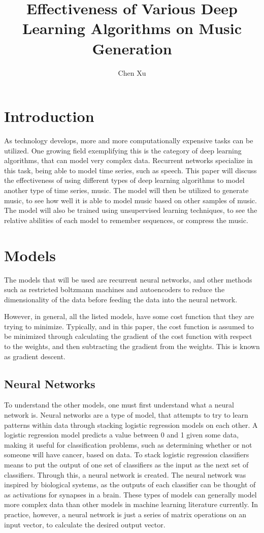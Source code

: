 \documentclass{article}
\begin{document}
\author{Chen Xu}
\title{Effectiveness of Various Deep Learning Algorithms on Music Generation}
\maketitle

\section{Introduction}
As technology develops, more and more computationally expensive tasks can be
utilized. One growing field exemplifying this is the category of deep learning
algorithms, that can model very complex data.  Recurrent networks specialize in
this task, being able to model time series, such as speech. This paper will
discuss the effectiveness of using different types of deep learning algorithms
to model another type of time series, music. The model will then be utilized to
generate music, to see how well it is able to model music based on other samples
of music. The model will also be trained using unsupervised learning techniques,
to see the relative abilities of each model to remember sequences, or compress
the music.

\section{Models}
The models that will be used are recurrent neural networks, and other methods
such as restricted boltzmann machines and autoencoders to reduce the
dimensionality of the data before feeding the data into the neural network.

However, in general, all the listed models, have some cost function that they
are trying to minimize. Typically, and in this paper, the cost function is
assumed to be minimized through calculating the gradient of the cost function
with respect to the weights, and then subtracting the gradient from the weights.
This is known as gradient descent.

\subsection{Neural Networks}
To understand the other models, one must first understand what a neural network
is. Neural networks are a type of model, that attempts to try to learn patterns
within data through stacking logistic regression models on each other. A
logistic regression model predicts a value between 0 and 1 given some data,
making it useful for classification problems, such as determining whether or not
someone will have cancer, based on data. To stack logistic regression
classifiers means to put the output of one set of classifiers as the input as
the next set of classifiers. Through this, a neural network is created. The
neural network was inspired by biological systems, as the outputs of each
classifier can be thought of as activations for synapses in a brain. These types
of models can generally model more complex data than other models in machine
learning literature currently. In practice, however, a neural network is just a
series of matrix operations on an input vector, to calculate the desired output
vector.
\end{document}
